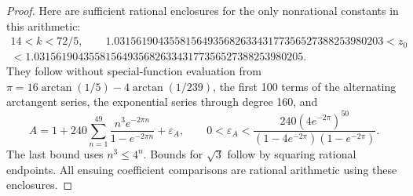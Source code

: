 \begin{proof}
Here are sufficient rational enclosures for the only nonrational
constants in this arithmetic:
\begin{equation}\label{ari:eq:cc-constants}
 \begin{gathered}
 14<k<72/5,\qquad
 1.0315619043558156493568263343177356527388253980203
 <z_0\\
 <1.0315619043558156493568263343177356527388253980205.
 \end{gathered}
\end{equation}
They follow without special-function evaluation from
$\pi=16\arctan(1/5)-4\arctan(1/239)$, the first 100 terms
of the alternating arctangent series, the exponential series
through degree 160, and
\[
 A=1+240\sum_{n=1}^{49}\frac{n^3e^{-2\pi n}}{1-e^{-2\pi n}}
       +\varepsilon_A,\qquad
 0<\varepsilon_A<
 \frac{240(4e^{-2\pi})^{50}}
 {(1-4e^{-2\pi})(1-e^{-2\pi})}.
\]
The last bound uses $n^3\le4^n$. Bounds for $\sqrt3$ follow
by squaring rational endpoints. All ensuing coefficient
comparisons are rational arithmetic using these enclosures.


\end{proof}
